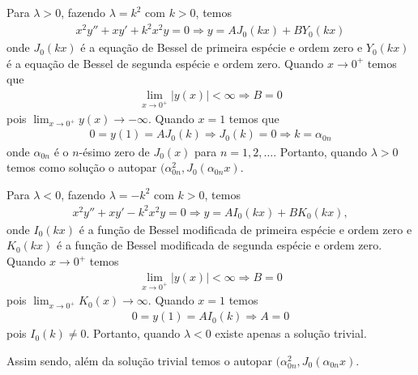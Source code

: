 \documentclass[a4paper,12pt, leqno, answers]{exam}
\begin{document}
\begin{questions}
\begin{parts}
\begin{solution}
            Para $\lambda > 0$, fazendo $\lambda = k^2$ com $k > 0$, temos
            \begin{align*}
                x^2 y'' + x y' + k^2 x^2 y = 0 \Rightarrow y = A J_0(k x) + B Y_0(k x)
            \end{align*}
            onde $J_0(k x)$ \'{e} a equa\c{c}\~{a}o de Bessel de primeira esp\'{e}cie e ordem zero e $Y_0(k x)$ \'{e} a equa\c{c}\~{a}o de Bessel de segunda esp\'{e}cie e ordem zero. Quando $x \to 0^+$ temos que
            \begin{align*}
                \lim_{x \to 0^+} | y(x) | < \infty \Rightarrow B = 0
            \end{align*}
            pois $\lim_{x \to 0^+} y(x) \to -\infty$. Quando $x = 1$ temos que
            \begin{align*}
                0 = y(1) = A J_0(k) \Rightarrow J_0(k) = 0 \Rightarrow k = \alpha_{0n}
            \end{align*}
            onde $\alpha_{0n}$ \'{e} o $n$-\'{e}simo zero de $J_0(x)$ para $n = 1, 2, \ldots$. Portanto, quando $\lambda > 0$ temos como solu\c{c}\~{a}o o autopar $(\alpha_{0n}^2, J_0(\alpha_{0n} x)$.

            Para $\lambda < 0$, fazendo $\lambda = - k^2$ com $k > 0$, temos
            \begin{align*}
                x^2 y'' + x y' - k^2 x^2 y = 0 \Rightarrow y = A I_0(k x) + B K_0(k x),
            \end{align*}
            onde $I_0(k x)$ \'{e} a fun\c{c}\~{a}o de Bessel modificada de primeira esp\'{e}cie e ordem zero e $K_0(k x)$ \'{e} a fun\c{c}\~{a}o de Bessel modificada de segunda esp\'{e}cie e ordem zero. Quando $x \to 0^+$ temos
            \begin{align*}
                \lim_{x \to 0^+} | y(x) | < \infty \Rightarrow B = 0
            \end{align*}
            pois $\lim_{x \to 0^+} K_0(x) \to \infty$. Quando $x = 1$ temos
            \begin{align*}
                0 = y(1) = A I_0(k) \Rightarrow A = 0
            \end{align*}
            pois $I_0(k) \neq 0$. Portanto, quando $\lambda < 0$ existe apenas a solu\c{c}\~{a}o trivial.

            Assim sendo, al\'{e}m da solu\c{c}\~{a}o trivial temos o autopar $(\alpha_{0n}^2, J_0(\alpha_{0n} x)$.
        \end{solution}
        

\end{parts}
\end{questions}
\end{document}
